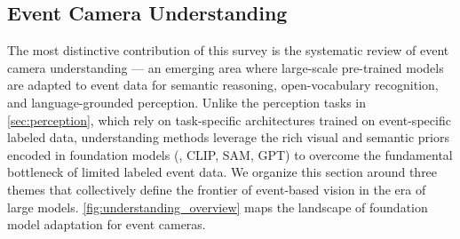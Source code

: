 \subsection{Event Camera Understanding}
\label{sec:understanding}

The most distinctive contribution of this survey is the systematic review of event camera understanding --- an emerging area where large-scale pre-trained models are adapted to event data for semantic reasoning, open-vocabulary recognition, and language-grounded perception. Unlike the perception tasks in \cref{sec:perception}, which rely on task-specific architectures trained on event-specific labeled data, understanding methods leverage the rich visual and semantic priors encoded in foundation models (\eg, CLIP, SAM, GPT) to overcome the fundamental bottleneck of limited labeled event data. We organize this section around three themes that collectively define the frontier of event-based vision in the era of large models. \cref{fig:understanding_overview} maps the landscape of foundation model adaptation for event cameras.

